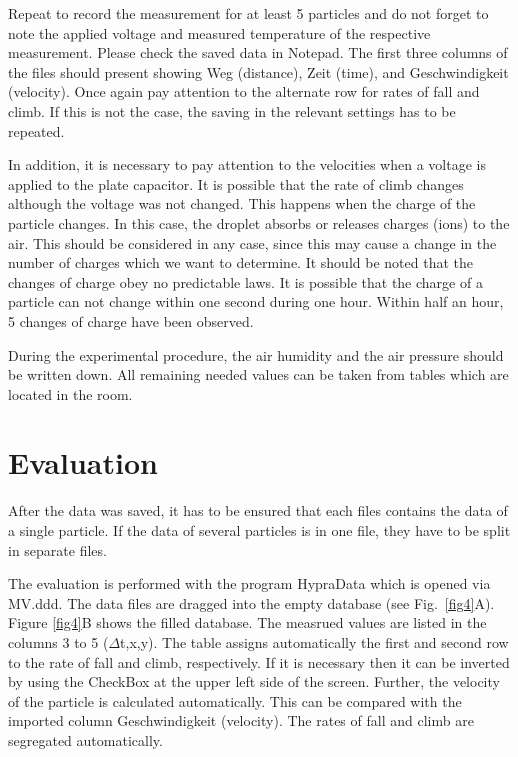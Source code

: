 \documentclass{tudphygp_eng}
\begin{document}
Repeat to record the measurement for at least 5 particles and do not forget to note the applied voltage and measured temperature of the respective measurement. Please check the saved data in Notepad. The first three columns of the files should present showing \grqq{}Weg\grqq{} (distance), \grqq{}Zeit\grqq{} (time), and \grqq{}Geschwindigkeit\grqq{} (velocity). Once again pay attention to the alternate row for rates of fall and climb. If this is not the case, the saving in the relevant settings has to be repeated.

In addition, it is necessary to pay attention to the velocities when a voltage is applied to the plate capacitor. It is possible that the rate of climb changes although the voltage was not changed. This happens when the charge of the particle changes. In this case, the droplet absorbs or releases charges (ions) to the air. This should be considered in any case, since this may cause a change in the number of charges which we want to determine. It should be noted that the changes of charge obey no predictable laws. It is possible that the charge of a particle can not change within one second during one hour. Within half an hour, 5 changes of charge have been observed.

During the experimental procedure, the air humidity and the air pressure should be written down. All remaining needed values can be taken from tables which are located in the room.

\section{Evaluation}

After the data was saved, it has to be ensured that each files contains the data of a single particle. If the data of several particles is in one file, they have to be split in separate files.

The evaluation is performed with the program HypraData which is opened via MV.ddd. The data files are dragged into the empty database (see Fig.~\ref{fig4}A). Figure \ref{fig4}B shows the filled database. The measrued values are listed in the columns 3 to 5 ($\Delta$t,x,y). The table assigns automatically the first and second row to the rate of fall and climb, respectively. If it is necessary then it can be inverted by using the CheckBox at the upper left side of the screen. Further, the velocity of the particle is calculated automatically. This can be compared with the imported column \grqq{}Geschwindigkeit\grqq{} (velocity). The rates of fall and climb are segregated automatically.
\end{document}
